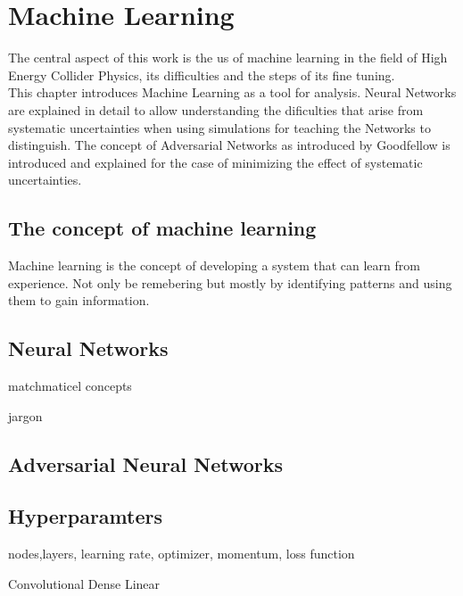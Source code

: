\section{Machine Learning}

The central aspect of this work is the us of machine learning in the field of High Energy Collider Physics, its difficulties and the steps of its fine tuning.\\
This chapter introduces Machine Learning as a tool for analysis. Neural Networks are explained in detail to allow understanding the dificulties that arise from systematic uncertainties when using simulations for teaching the Networks to distinguish.
The concept of Adversarial Networks as introduced by Goodfellow is introduced and explained for the case of minimizing the effect of systematic uncertainties.

\subsection{The concept of machine learning}

Machine learning is the concept of developing a system that can learn from experience. Not only be remebering but mostly by identifying patterns and using them to gain information.

\subsection{Neural Networks}

matchmaticel concepts

jargon

\subsection{Adversarial Neural Networks}

\subsection{Hyperparamters}

nodes,layers, learning rate, optimizer, momentum, loss function

Convolutional Dense Linear

